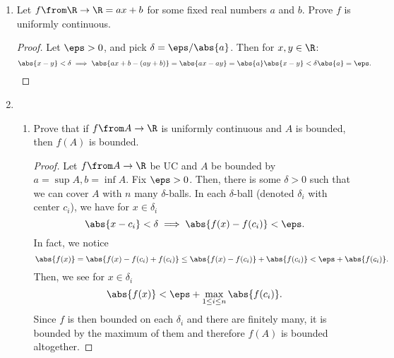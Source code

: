 \documentclass{article}
\begin{document}
\begin{enumerate}
\begin{enumerate}
\begin{proof}
                Thus, let $a = \max S$ and $b = \max S \setminus a$. By our choice of $a, b$ there is no value of $h(a_{k})$ between them,
                but this is contradictory to the fact that $h(a_{k})$ is dense. Hence, $h$ cannot be continuous at $x = 0$.
                \end{proof}

          \item Prove $g(x) = x \cdot h(x)$ is continuous at $x = 0$.

                \begin{proof}
                  Let $\eps > 0$ and pick $\delta = \eps$. Then, we see that
                  \[ 0 < \abs{x - 0} < \delta \implies \abs{g(x) - g(0)} = \abs{g(x)} \le \abs{x} < \delta = \eps. \]
                  This is true because $\sin(y) \in [-1, 1]$ and $\abs{x \sin y} \le \abs{x}$ then.
                \end{proof}

        \end{enumerate}

  \item Let $f \from \R \to \R = ax + b$ for some fixed real numbers $a$ and $b$. Prove $f$ is uniformly continuous.
        \begin{proof}
          Let $\eps > 0$, and pick $\delta = \eps/\abs{a}$. Then for $x, y \in \R$:
          \[ \abs{x - y} < \delta \implies \abs{ax + b - (ay + b)} = \abs{ax - ay} = \abs{a}\abs{x - y} < \delta\abs{a} = \eps. \]
        \end{proof}

  \item
        \begin{enumerate}

          \item Prove that if $f \from A \to \R$ is uniformly continuous and $A$ is bounded, then $f(A)$ is bounded.

                \begin{proof}
                  Let $f \from A \to \R$ be UC and $A$ be bounded by $a = \sup A, b = \inf A$.
                  Fix $\eps > 0$. Then, there is some $\delta > 0$ such that we can cover $A$ with $n$ many $\delta$-balls.
                  In each $\delta$-ball (denoted $\delta_{i}$ with center $c_{i}$), we have for $x \in \delta_{i}$
                  \[ \abs{x - c_{i}} < \delta \implies \abs{f(x) - f(c_{i})} < \eps. \]
                  In fact, we notice
                  \[ \abs{f(x)} = \abs{f(x) - f(c_{i}) + f(c_{i})} \le \abs{f(x) - f(c_{i})} + \abs{f(c_{i})} < \eps + \abs{f(c_{i})}. \]
                  Then, we see for $x \in \delta_{i}$
                  \[ \abs{f(x)} < \eps + \max\limits_{1 \le i \le n}\abs{f(c_{i})}. \]
                  Since $f$ is then bounded on each $\delta_{i}$ and there are finitely many, it is bounded by the maximum of them and therefore
                  $f(A)$ is bounded altogether.
                \end{proof}


\end{enumerate}
\end{enumerate}
\end{document}
